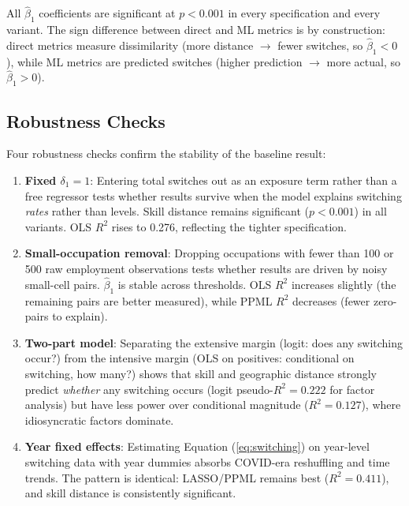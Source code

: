 \documentclass[12pt]{article}
\begin{document}
All $\hat{\beta}_1$ coefficients are significant at $p < 0.001$ in every specification and every variant. The sign difference between direct and ML metrics is by construction: direct metrics measure dissimilarity (more distance $\rightarrow$ fewer switches, so $\hat{\beta}_1 < 0$), while ML metrics are predicted switches (higher prediction $\rightarrow$ more actual, so $\hat{\beta}_1 > 0$).

\subsection{Robustness Checks}
\label{sec:results_robust}

Four robustness checks confirm the stability of the baseline result:

\begin{enumerate}
    \item \textbf{Fixed $\delta_1 = 1$}: Entering total switches out as an exposure term rather than a free regressor tests whether results survive when the model explains switching \emph{rates} rather than levels. Skill distance remains significant ($p < 0.001$) in all variants. OLS $R^2$ rises to 0.276, reflecting the tighter specification.

    \item \textbf{Small-occupation removal}: Dropping occupations with fewer than 100 or 500 raw employment observations tests whether results are driven by noisy small-cell pairs. $\hat{\beta}_1$ is stable across thresholds. OLS $R^2$ increases slightly (the remaining pairs are better measured), while PPML $R^2$ decreases (fewer zero-pairs to explain).

    \item \textbf{Two-part model}: Separating the extensive margin (logit: does any switching occur?) from the intensive margin (OLS on positives: conditional on switching, how many?) shows that skill and geographic distance strongly predict \emph{whether} any switching occurs (logit pseudo-$R^2 = 0.222$ for factor analysis) but have less power over conditional magnitude ($R^2 = 0.127$), where idiosyncratic factors dominate.

    \item \textbf{Year fixed effects}: Estimating Equation (\ref{eq:switching}) on year-level switching data with year dummies absorbs COVID-era reshuffling and time trends. The pattern is identical: LASSO/PPML remains best ($R^2 = 0.411$), and skill distance is consistently significant.
\end{enumerate}
\end{document}
